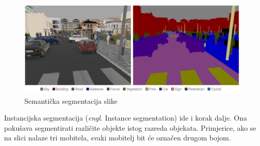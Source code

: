 \begin{enumerate}
\begin{figure}[htb]
\centering
\includegraphics[width=\linewidth]{img/SemanticSegmentation.png}
\caption{Semantička segmentacija slike}
\label{img:semanticSegmentation}
\end{figure}

Instancijska segmentacija (\textit{engl.} Instance segmentation) ide i korak dalje. Ona pokušava segmentirati različite objekte istog razreda objekata. Primjerice, ako se na slici nalaze tri mobitela, svaki mobitelj bit će označen drugom bojom.


\end{enumerate}

